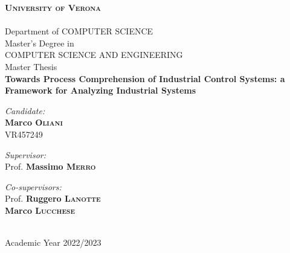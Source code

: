 
\newcommand{\thesistitle}{Towards Process Comprehension of Industrial Control Systems: a Framework for Analyzing Industrial Systems}
\newcommand{\supervisor}{Prof. \textbf{Massimo \textsc{Merro}}}
\newcommand{\firstcosupervisor}{Prof. \textbf{Ruggero \textsc{Lanotte}}}
\newcommand{\secondcosupervisor}{\textbf{Marco \textsc{Lucchese}}}
\newcommand{\opponent}{Prof. \textbf{Mariano \textsc{Ceccato}}}
\newcommand{\candidate}{\textbf{Marco \textsc{Oliani}}\\VR457249}
\newcommand{\academicyear}{\normalsize Academic Year 2022/2023}

\begin{titlepage}
	\begin{center}
		\thispagestyle{empty}
		
		
		\textsc{\Large\bfseries University of Verona}\\
		\hrulefill \\[0.1cm]
		\large Department of \textsc{COMPUTER SCIENCE}\\[1.0cm]
		
		\normalsize Master's Degree in \\
		\normalsize\textsc{COMPUTER SCIENCE AND ENGINEERING}\\[1.5cm]
		
		\large Master Thesis \\[1.0cm]
		
		{ \Large\bfseries\thesistitle} \\[3.0cm]
		
		\begin{minipage}[t]{0.45\textwidth}
			\begin{flushleft} \normalsize
				\emph{Candidate:} \\
				\candidate
			\end{flushleft}
		\end{minipage}
		\begin{minipage}[t]{0.45\textwidth}\raggedleft
			\begin{flushright} \normalsize
				\emph{Supervisor:}\\
				\supervisor 
			\end{flushright}
			\begin{flushright} \normalsize
				\emph{Co-supervisors:}\\
				\firstcosupervisor \\
				\secondcosupervisor
			\end{flushright}
		\end{minipage}
		
		\vfill
		
		\hrulefill \\[0.1cm]
		\academicyear
		
	\end{center}
\end{titlepage}

\thispagestyle{empty}